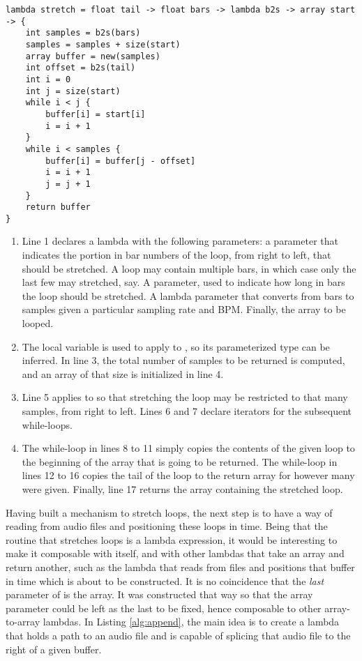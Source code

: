 \begin{lstlisting}[emph={lambda,float,array,int,size,new,while,return},emphstyle={\textbf},caption={Stretching a loop in \emph{Scandal}.},label={alg:stretch}]
lambda stretch = float tail -> float bars -> lambda b2s -> array start -> {
	int samples = b2s(bars)
	samples = samples + size(start)
	array buffer = new(samples)
	int offset = b2s(tail)
	int i = 0
	int j = size(start)
	while i < j {
		buffer[i] = start[i]
		i = i + 1
	}
	while i < samples {
		buffer[i] = buffer[j - offset]
		i = i + 1
		j = j + 1
	}
	return buffer
}
\end{lstlisting}

\begin{enumerate}
	\item Line 1 declares a  lambda with the following parameters: a  parameter that indicates the portion in bar numbers of the loop, from right to left, that should be stretched. A loop may contain multiple bars, in which case only the last few may stretched, say. A  parameter, used to indicate how long in bars the loop should be stretched. A lambda parameter that converts from bars to samples given a particular sampling rate and BPM. Finally, the array to be looped.
	\item The local variable  is used to apply  to , so its parameterized type can be inferred. In line 3, the total number of samples to be returned is computed, and an array of that size is initialized in line 4.
	\addtocounter{enumi}{2}
	\item Line 5 applies  to  so that stretching the loop may be restricted to that many samples, from right to left. Lines 6 and 7 declare iterators for the subsequent while-loops.
	\addtocounter{enumi}{2}
	\item The while-loop in lines 8 to 11 simply copies the contents of the given loop to the beginning of the array that is going to be returned. The while-loop in lines 12 to 16 copies the tail of the loop to the return array for however many  were given. Finally, line 17 returns the array containing the stretched loop.
\end{enumerate}

Having built a mechanism to stretch loops, the next step is to have a way of reading from audio files and positioning these loops in time. Being that the routine that stretches loops is a lambda expression, it would be interesting to make it composable with itself, and with other lambdas that take an array and return another, such as the lambda that reads from files and positions that buffer in time which is about to be constructed. It is no coincidence that the \emph{last} parameter of  is the array. It was constructed that way so that the array parameter could be left as the last to be fixed, hence composable to other array-to-array lambdas. In Listing \ref{alg:append}, the main idea is to create a lambda that holds a path to an audio file and is capable of splicing that audio file to the right of a given buffer.

